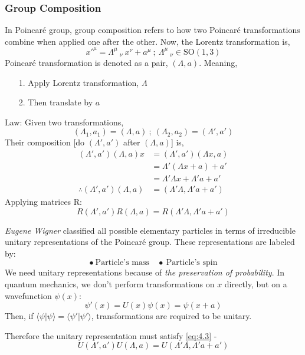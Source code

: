 \documentclass[14pt]{article} %
\begin{document}
\subsubsection{Group Composition}
In Poincaré group, group composition refers to how two Poincaré transformations combine when applied one after the other.
Now, the Lorentz transformation is,
$$x'^\mu = \Lambda^\mu~_\nu~x^\nu + a^\mu ~ ; ~\Lambda^\mu~_\nu \in \text{SO}(1,3)$$
Poincaré transformation is denoted as a pair, $(\Lambda, a)$. Meaning,
\begin{itemize}
    \item [1.] Apply Lorentz transformation, $\Lambda$ 
    \item [2.] Then translate by $a$
\end{itemize}
Law: 
Given two transformations,
$$
(\Lambda_1, a_1)=(\Lambda, a)~;~(\Lambda_2, a_2)=(\Lambda', a')
$$
Their composition [do $(\Lambda', a')$ after $(\Lambda, a)$] is,
\begin{align*}
    (\Lambda', a')(\Lambda, a)x &= (\Lambda', a')(\Lambda x, a) \\
                                &= \Lambda'(\Lambda x+a) + a' \\
                                &= \Lambda'\Lambda x+\Lambda' a + a' \\
  \therefore (\Lambda', a')(\Lambda, a) &= (\Lambda'\Lambda,\Lambda' a + a') \tag{4.2} \label{eq:4.2}
\end{align*}
Applying matrices R: 
\[R(\Lambda', a')R(\Lambda, a) = R(\Lambda'\Lambda,\Lambda' a + a') \tag{4.3} \label{eq:4.3}
\]
\begin{tcolorbox}[ title=\textbf{Question: Why Unitary representation}]
\textit{Eugene Wigner} classified all possible elementary particles in terms of irreducible unitary representations of the Poincaré group. These representations are labeled by:
\[
\bullet ~\text{Particle's mass}\quad \bullet ~\text{Particle's spin}
\]
We need unitary representations because of \textit{the preservation of probability}. In quantum mechanics, we don't perform transformations on $x$ directly, but on a wavefunction $\psi(x)$:
\[
\psi'(x) = U(x)\psi(x) = \psi(x+a)
\]
Then, if $\langle \psi | \psi \rangle = \langle \psi' | \psi' \rangle$, transformations are required to be unitary.
\end{tcolorbox}
Therefore the unitary representation must satisfy \eqref{eq:4.3} -
\[
U(\Lambda', a')U(\Lambda, a) = U(\Lambda'\Lambda,\Lambda' a + a') \tag{4.4} \label{eq:4.4}
\]
\end{document}
